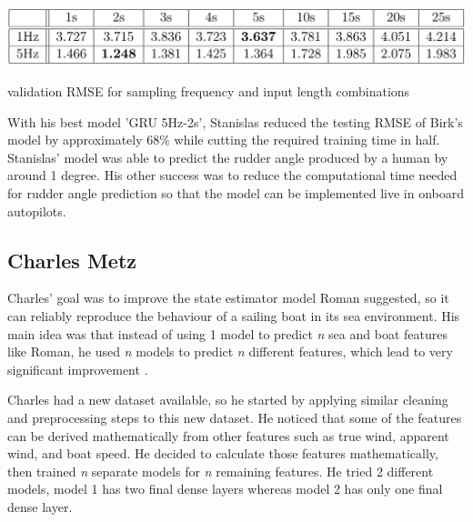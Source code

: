 \documentclass[12pt,twoside]{report}
\begin{document}
\begin{table}[h]
\centering
\includegraphics[width=\linewidth]{figures/stan grid search.png}
\caption{validation RMSE for sampling frequency and input length combinations \cite{stan}}
\label{tbl:stan grid}
\end{table}

With his best model 'GRU 5Hz-2s', Stanislas reduced the testing RMSE of Birk's model by approximately 68\% while cutting the required training time in half. Stanislas' model was able to predict the rudder angle produced by a human by around 1 degree. His other success was to reduce the computational time needed for rudder angle prediction so that the model can be implemented live in onboard autopilots.

\subsection{Charles Metz}
Charles' goal was to improve the state estimator model Roman suggested, so it can reliably reproduce the behaviour of a sailing boat in its sea environment. His main idea was that instead of using 1 model to predict \emph{n} sea and boat features like Roman, he used \emph{n} models to predict \emph{n} different features, which lead to very significant improvement \cite{charles}.

Charles had a new dataset available, so he started by applying similar cleaning and preprocessing steps to this new dataset. He noticed that some of the features can be derived mathematically from other features such as true wind, apparent wind, and boat speed. He decided to calculate those features mathematically, then trained \emph{n} separate models for \emph{n} remaining features. He tried 2 different models, model 1 has two final dense layers whereas model 2 has only one final dense layer.
\end{document}
